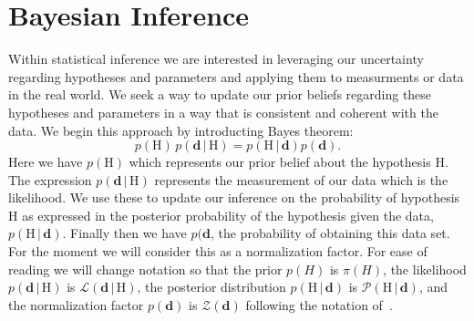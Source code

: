 \section{Bayesian Inference}
Within statistical inference we are interested in leveraging our uncertainty regarding hypotheses and parameters and applying them to measurments or data in the real world. We seek a way to update our prior beliefs regarding these hypotheses and parameters in a way that is consistent and coherent with the data. We begin this approach by introducting Bayes theorem:
\begin{equation} \label{eqn:BayesTheorem_basic}
     p(\mathrm{H}) \, p(\mathbf{d} \, |\, \mathrm{H})  =  p(\mathrm{H} \, | \, \mathbf{d}) p(\mathbf{d}).
\end{equation}
Here we have $p(\mathrm{H})$ which represents our prior belief about the hypothesis H. The expression $p(\mathbf{d} \, |\, \mathrm{H})$ represents the measurement of our data which is the likelihood. We use these to update our inference on the probability of hypothesis H as expressed in the posterior probability of the hypothesis given the data, $p(\mathrm{H} \, | \, \mathbf{d})$. Finally then we have $p(\mathbf{d}$, the probability of obtaining this data set. For the moment we will consider this as a normalization factor. For ease of reading we will change notation so that the prior $p(H)$ is $\pi (H)$, the likelihood $p(\mathbf{d} \, |\, \mathrm{H})$ is $\mathcal{L}(\mathbf{d} \, | \, \mathrm{H})$, the posterior distribution $p(\mathrm{H} \, | \, \mathbf{d})$ is $\mathcal{P}(\mathrm{H} \, | \, \mathbf{d})$, and the normalization factor $p(\mathbf{d})$ is $\mathcal{Z}(\mathbf{d})$ following the notation of~\cite{hobson2010bayesian}.

